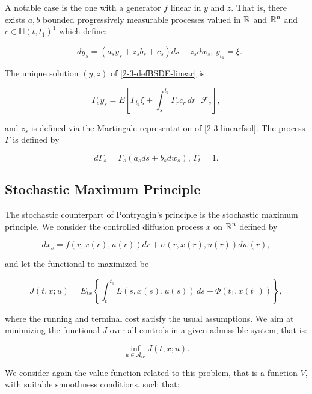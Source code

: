 A notable case is the one with a generator $f$ linear in $y$ and $z$. That is, there exists 
$a,b$ bounded progressively measurable processes valued in $\mathbb{R}$ and $\mathbb{R}^n$ and $c\in\mathbb{H}(t,t_1)^1$ which define:

\begin{equation}\label{2-3-defBSDE-linear}-dy_s = \left(a_sy_s + z_sb_s + c_s\right)ds - z_sdw_s,\,y_{t_1}=\xi.\end{equation}

\begin{proposition}
    The unique solution $(y,z)$ of \eqref{2-3-defBSDE-linear} is
    
    \begin{equation}\label{2-3-linearfsol}
        \Gamma_sy_s = E\left[\Gamma_{t_1}\xi + \int_s^{t_1} \Gamma_rc_r\,dr\,|\,\mathcal{F}_s\right],
    \end{equation}

    and $z_s$ is defined via the Martingale representation of \eqref{2-3-linearfsol}. The process $\Gamma$ is defined by

    \[d\Gamma_s = \Gamma_s\left(a_sds + b_sdw_s\right),\,\Gamma_t=1.\]
\end{proposition}

\subsection{Stochastic Maximum Principle}

The stochastic counterpart of Pontryagin's principle is the stochastic maximum principle. We consider the controlled diffusion process $x$ on $\mathbb{R}^n$ defined by

\begin{equation}
    dx_s = f(r,x(r),u(r))dr + \sigma(r,x(r),u(r))dw(r),
\end{equation}

and let the functional to maximized be

\begin{equation}\label{2-3-newfunctmax}
    J(t,x;u) = E_{tx}\left\{\int_t^{t_1}L(s,x(s),u(s))\,ds + \Phi(t_1,x(t_1))\right\},
\end{equation}

where the running and terminal cost satisfy the usual assumptions. We aim at minimizing the functional $J$ over all 
controls in a given admissible system, that is:

\[\inf_{u\in\mathcal{A}_{t\nu}} J(t,x;u).\]

We consider again the value function related to this problem, that is a function $V$, with suitable smoothness conditions, such that:

